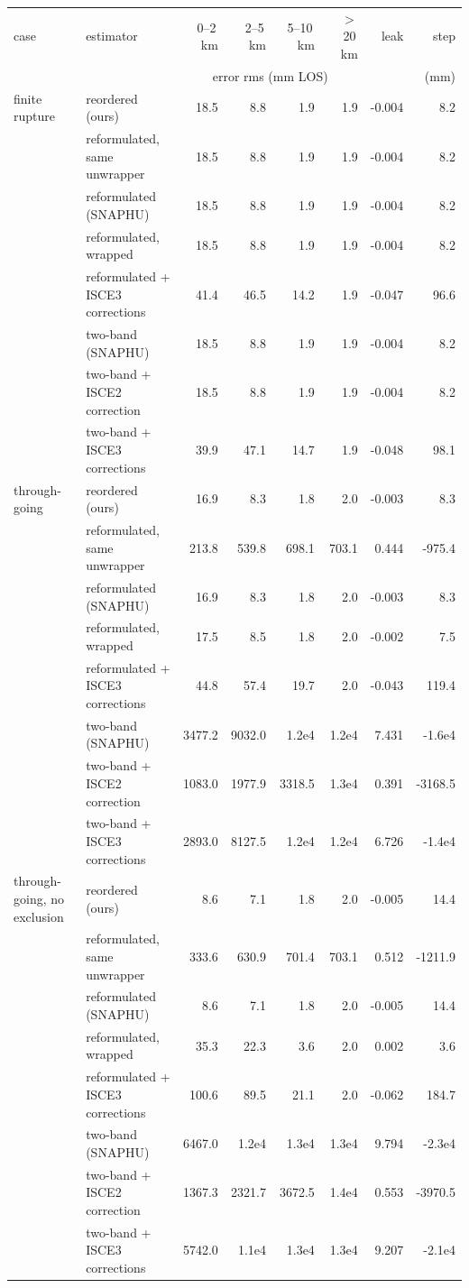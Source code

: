 \begin{tabular}{llrrrrrr}
\toprule
case & estimator & 0--2\,km & 2--5\,km & 5--10\,km & $>$20\,km & leak & step \\
 & & \multicolumn{4}{c}{error rms (mm LOS)} & & (mm) \\
\midrule
finite rupture & reordered (ours) & 18.5 & 8.8 & 1.9 & 1.9 & -0.004 & 8.2 \\
 & reformulated, same unwrapper & 18.5 & 8.8 & 1.9 & 1.9 & -0.004 & 8.2 \\
 & reformulated (SNAPHU) & 18.5 & 8.8 & 1.9 & 1.9 & -0.004 & 8.2 \\
 & reformulated, wrapped & 18.5 & 8.8 & 1.9 & 1.9 & -0.004 & 8.2 \\
 & reformulated + ISCE3 corrections & 41.4 & 46.5 & 14.2 & 1.9 & -0.047 & 96.6 \\
 & two-band (SNAPHU) & 18.5 & 8.8 & 1.9 & 1.9 & -0.004 & 8.2 \\
 & two-band + ISCE2 correction & 18.5 & 8.8 & 1.9 & 1.9 & -0.004 & 8.2 \\
 & two-band + ISCE3 corrections & 39.9 & 47.1 & 14.7 & 1.9 & -0.048 & 98.1 \\
\midrule
through-going & reordered (ours) & 16.9 & 8.3 & 1.8 & 2.0 & -0.003 & 8.3 \\
 & reformulated, same unwrapper & 213.8 & 539.8 & 698.1 & 703.1 & 0.444 & -975.4 \\
 & reformulated (SNAPHU) & 16.9 & 8.3 & 1.8 & 2.0 & -0.003 & 8.3 \\
 & reformulated, wrapped & 17.5 & 8.5 & 1.8 & 2.0 & -0.002 & 7.5 \\
 & reformulated + ISCE3 corrections & 44.8 & 57.4 & 19.7 & 2.0 & -0.043 & 119.4 \\
 & two-band (SNAPHU) & 3477.2 & 9032.0 & 1.2e4 & 1.2e4 & 7.431 & -1.6e4 \\
 & two-band + ISCE2 correction & 1083.0 & 1977.9 & 3318.5 & 1.3e4 & 0.391 & -3168.5 \\
 & two-band + ISCE3 corrections & 2893.0 & 8127.5 & 1.2e4 & 1.2e4 & 6.726 & -1.4e4 \\
\midrule
through-going, no exclusion & reordered (ours) & 8.6 & 7.1 & 1.8 & 2.0 & -0.005 & 14.4 \\
 & reformulated, same unwrapper & 333.6 & 630.9 & 701.4 & 703.1 & 0.512 & -1211.9 \\
 & reformulated (SNAPHU) & 8.6 & 7.1 & 1.8 & 2.0 & -0.005 & 14.4 \\
 & reformulated, wrapped & 35.3 & 22.3 & 3.6 & 2.0 & 0.002 & 3.6 \\
 & reformulated + ISCE3 corrections & 100.6 & 89.5 & 21.1 & 2.0 & -0.062 & 184.7 \\
 & two-band (SNAPHU) & 6467.0 & 1.2e4 & 1.3e4 & 1.3e4 & 9.794 & -2.3e4 \\
 & two-band + ISCE2 correction & 1367.3 & 2321.7 & 3672.5 & 1.4e4 & 0.553 & -3970.5 \\
 & two-band + ISCE3 corrections & 5742.0 & 1.1e4 & 1.3e4 & 1.3e4 & 9.207 & -2.1e4 \\
\bottomrule
\end{tabular}
